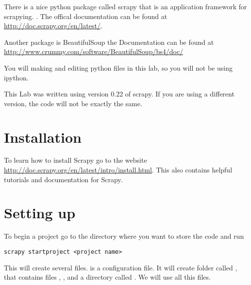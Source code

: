 There is a nice python package called scrapy that is an application framework for scrapying. . The offical documentation can be found at \url{http://doc.scrapy.org/en/latest/}. 

Another package is BeautifulSoup the Documentation can be found at \url{http://www.crummy.com/software/BeautifulSoup/bs4/doc/}

\begin{info}
You will making and editing python files in this lab, so you will not be using ipython.
\end{info}

\begin{warn}
This Lab was written using version 0.22 of scrapy. If you are using a different version, the code will not be exactly the same.
\end{warn}

\section*{Installation}

To learn how to install Scrapy go to the website \url{http://doc.scrapy.org/en/latest/intro/install.html}. This also contains helpful tutorials and documentation for Scrapy.

\section*{Setting up}

\begin{comment}
\begin{problem}
Work thourgh the tutorial from the url above. You should turn in items.json as specified in the tutorial.
\end{problem}


When you run
\begin{lstlisting}
scrapy crawl dmoz -o items.json -t json
\end{lstlisting}
which generates a file \li{items.json} where all the scraped items are serialized in JSON. You can also store them in csv or xml by changing all the json to csv or xml.
For example
\begin{lstlisting}
scrapy crawl dmoz -o items.csv -t csv
\end{lstlisting}
generates a file \li{items.csv} where all the scraped items are stored in a csv file.
\end{comment}


To begin a project go to the directory where you want to store the code and run
\begin{lstlisting}
scrapy startproject <project name>
\end{lstlisting}
This will create several files.  is a configuration file. It will create folder called  , that contains files , ,  and a directory called . We will use all this files.

